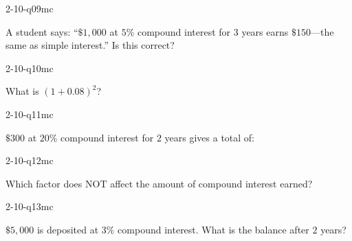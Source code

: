 \begin{practiceQuestion}{2-10-q09}{mc}
\begin{questionText}
A student says: ``$\$1{,}000$ at $5\%$ compound interest for $3$ years earns $\$150$---the same as simple interest.'' Is this correct?
\end{questionText}
\end{practiceQuestion}

\begin{practiceQuestion}{2-10-q10}{mc}
\begin{questionText}
What is $(1 + 0.08)^2$?
\end{questionText}
\end{practiceQuestion}

\begin{practiceQuestion}{2-10-q11}{mc}
\begin{questionText}
$\$300$ at $20\%$ compound interest for $2$ years gives a total of:
\end{questionText}
\end{practiceQuestion}

\begin{practiceQuestion}{2-10-q12}{mc}
\begin{questionText}
Which factor does NOT affect the amount of compound interest earned?
\end{questionText}
\end{practiceQuestion}

\begin{practiceQuestion}{2-10-q13}{mc}
\begin{questionText}
$\$5{,}000$ is deposited at $3\%$ compound interest. What is the balance after $2$ years?
\end{questionText}
\end{practiceQuestion}

